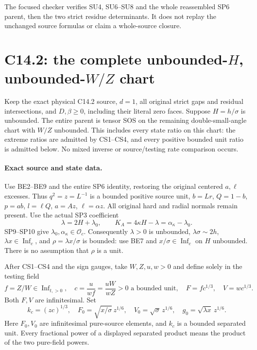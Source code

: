 The focused checker verifies SU4, SU6--SU8 and the whole reassembled
SP6 parent, then the two strict residue determinants.  It does not
replay the unchanged source formulas or claim a whole-source closure.


\section{\texorpdfstring{C14.2: the complete unbounded-$H$, unbounded-$W/Z$ chart}{C14.2: the complete unbounded-H, unbounded-W/Z chart}}
\label{component:p831dd6874dcf}

\begin{proposition}
Keep the exact physical C14.2 source, $d=1$, all original strict
gaps and residual intersections, and $D,\beta\ge0$, including their
literal zero faces.  Suppose $H=h/\sigma$ is unbounded.  The entire
parent is tensor SOS on the remaining double-small-angle chart with
$W/Z$ unbounded.  This includes every state ratio on this chart:
the extreme ratios are admitted by CS1--CS4, and every
positive bounded unit ratio is admitted below.  No mixed inverse or
source/testing rate comparison occurs.
\end{proposition}

\paragraph{Exact source and state data.}
Use BE2--BE9 and the entire SP6 identity, restoring the original
centered $a,\ell$ excesses.  Thus $q^2=z=L^{-1}$ is a bounded
positive source unit, $b=Lr$, $Q=1-b$, $p=ab$, $l=\ell Q$,
$a=Az$, $\ell=\alpha z$.  All original hard and radial normals
remain present.  Use the actual SP3 coefficient
\[
 \lambda=2H+\lambda_0,
 \qquad K_A=4\kappa H-\lambda=\alpha_\kappa-\lambda_0.
                                                               \tag{CT1}
\]
SP9--SP10 give $\lambda_0,\alpha_\kappa\in\mathcal O_c$.
Consequently $\lambda>0$ is unbounded, $\lambda\sigma\sim2h$,
$\lambda x\in\operatorname{Inf}_c$, and
$\rho=\lambda x/\sigma$ is bounded: use BE7 and
$x/\sigma\in\operatorname{Inf}_c$ on $H$ unbounded.
There is no assumption that $\rho$ is a unit.

After CS1--CS4 and the sign gauges, take $W,Z,u,w>0$ and define solely
in the testing field
\[
 f=Z/W\in\operatorname{Inf}_{t,>0},\quad
 c=\frac{u}{wf}=\frac{uW}{wZ}>0\text{ a bounded unit},\quad
 F=fc^{1/3},\quad V=wc^{1/3}.
\]
Both $F,V$ are infinitesimal.  Set
\[
 k_c=(zc)^{1/3},\quad
 F_0=\sqrt{x/\sigma}\,z^{1/6},\quad
 V_0=\sqrt\sigma\,z^{1/6},\quad
 g_0=\sqrt{\lambda x}\,z^{1/6}.
                                                               \tag{CT2}
\]
Here $F_0,V_0$ are infinitesimal pure-source elements, and $k_c$ is
a bounded separated unit.  Every fractional power of a displayed
separated product means the product of the two pure-field powers.

